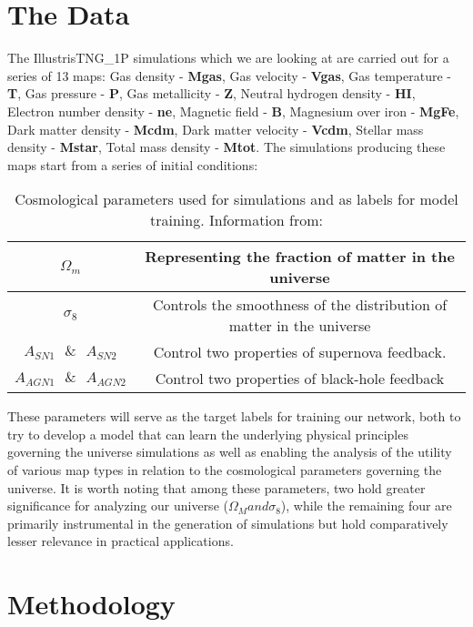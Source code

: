 \documentclass[11pt]{scrartcl}
\begin{document}
\section{The Data}
The IllustrisTNG\_1P simulations which we are looking at are carried out for a series of 13 maps: Gas density - \textbf{Mgas}, Gas velocity - \textbf{Vgas}, Gas temperature - \textbf{T}, Gas pressure - \textbf{P}, Gas metallicity - \textbf{Z}, Neutral hydrogen density - \textbf{HI}, Electron number density - \textbf{ne}, Magnetic field - \textbf{B}, Magnesium over iron - \textbf{MgFe}, Dark matter density - \textbf{Mcdm}, Dark matter velocity - \textbf{Vcdm}, Stellar mass density - \textbf{Mstar}, Total mass density - \textbf{Mtot}.
The simulations producing these maps start from a series of initial conditions:
\begin{table}[H]
    \centering
    \begin{tabular}{c|c}
         $\Omega_m$ & Representing the fraction of matter in the universe\\ \hline
         $\sigma_8$ & Controls the smoothness of the distribution of matter in the universe\\ \hline
         $A_{SN1} \textrm{ }\& \textrm{ } A_{SN2}$ & Control two properties of supernova feedback.\\ \hline
         $A_{AGN1}\textrm{ }  \& \textrm{ } A_{AGN2}$ & Control two properties of black-hole feedback
    \end{tabular}
    \caption{Cosmological parameters used for simulations and as labels for model training. Information from: \cite{CAMELSIllustris}}
    \label{tab:my_label}
\end{table}

These parameters will serve as the target labels for training our network, both to try to develop a model that can learn the underlying physical principles governing the universe simulations as well as enabling the analysis of the utility of various map types in relation to the cosmological parameters governing the universe. It is worth noting that among these parameters, two hold greater significance for analyzing our universe ($\Omega_M and \sigma_8$), while the remaining four are primarily instrumental in the generation of simulations but hold comparatively lesser relevance in practical applications.

\section{Methodology}
\end{document}
